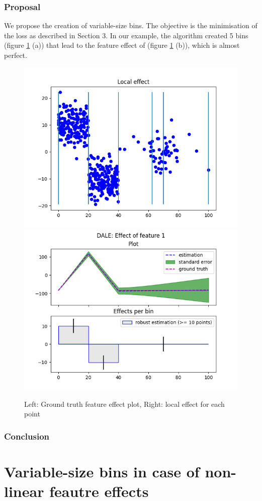 \documentclass{article}
\begin{document}
\subsubsection*{Proposal}

We propose the creation of variable-size bins. The objective is the
minimisation of the loss as described in Section 3. In our example,
the algorithm created 5 bins (figure \ref{fig:bullet-3-im-3} (a)) that
lead to the feature effect of (figure \ref{fig:bullet-3-im-3} (b)),
which is almost perfect.

\begin{figure}[!h]
  \centering
  \includegraphics[width=.49\linewidth]{bullet_3/im_5.png}
  \includegraphics[width=.49\linewidth]{bullet_3/im_7.png}\\
  \caption{Left: Ground truth feature effect plot, Right: local effect for each point}
  \label{fig:bullet-3-im-3}
\end{figure}

\subsubsection*{Conclusion}

\section{Variable-size bins in case of non-linear feautre effects}
\end{document}
